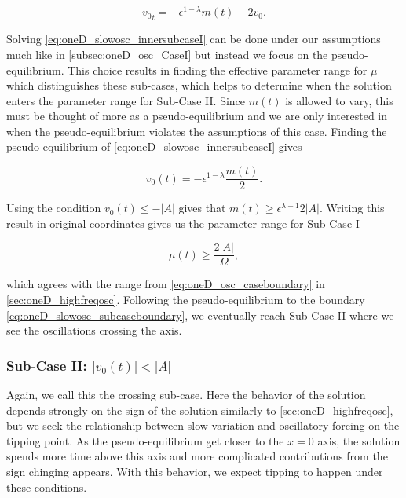 \begin{equation}\label{eq:oneD_slowosc_innersubcaseI}
{v_0}_t= -\epsilon^{1-\lambda}m(t)-2v_0.
\end{equation}

Solving \eqref{eq:oneD_slowosc_innersubcaseI} can be done under our assumptions much like in \autoref{subsec:oneD_osc_CaseI} but instead we focus on the pseudo-equilibrium. This choice results in finding the effective parameter range for $\mu$ which distinguishes these sub-cases, which helps to determine when the solution enters the parameter range for Sub-Case II. Since $m(t)$ is allowed to vary, this must be thought of more as a pseudo-equilibrium and we are only interested in when the pseudo-equilibrium violates the assumptions of this case. Finding the pseudo-equilibrium of \eqref{eq:oneD_slowosc_innersubcaseI} gives

\begin{equation*}
v_0(t)=-\epsilon^{1-\lambda}\frac{m(t)}{2}.
\end{equation*}

Using the condition $v_0(t)\le -|A|$ gives that $m(t)\ge \epsilon^{\lambda-1}2|A|$. Writing this result in original coordinates gives us the parameter range for Sub-Case I

\begin{equation}\label{eq:oneD_slowosc_subcaseboundary}
\mu(t)\ge \frac{2 |A|}{\Omega},
\end{equation}

which agrees with the range from \eqref{eq:oneD_osc_caseboundary} in \autoref{sec:oneD_highfreqosc}. Following the pseudo-equilibrium to the boundary \eqref{eq:oneD_slowosc_subcaseboundary}, we eventually reach Sub-Case II where we see the oscillations crossing the axis.

\subsubsection{Sub-Case II: $|v_0(t)|< |A|$}
\label{subsubsec:oneD_slowosc_subcaseII}

Again, we call this the crossing sub-case. Here the behavior of the solution depends strongly on the sign of the solution similarly to \autoref{sec:oneD_highfreqosc}, but we seek the relationship between slow variation and oscillatory forcing on the tipping point. As the pseudo-equilibrium get closer to the $x=0$ axis, the solution spends more time above this axis and more complicated contributions from the sign chinging appears. With this behavior, we expect tipping to happen under these conditions.

